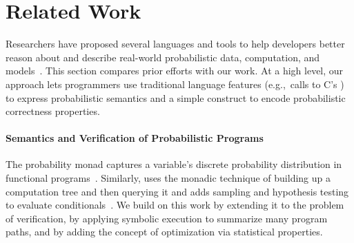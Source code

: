 

\section{Related Work}

Researchers have proposed several languages and tools to
help developers better reason about and describe real-world
probabilistic data, computation, and models~\cite{BBGR13,
  wingate-lightweight, church, chaganty, pfeffersample, pmonad,
  infernet, probdsl,uncertaint}.
This section compares prior efforts with our work.
At a high level, our approach lets programmers use traditional language
features (e.g.,~calls
to C's ) to express probabilistic semantics and a simple
construct to encode probabilistic correctness properties.

\paragraph{Semantics and Verification of Probabilistic Programs}
The probability monad captures a variable's discrete probability
distribution in functional programs~\cite{pmonad}.
Similarly,  uses the monadic technique of
building up a computation tree and then querying it and adds sampling and
hypothesis testing to evaluate conditionals~\cite{uncertaint}.
We build on this work by extending it to the problem of
verification, by applying symbolic execution to summarize many
program paths, and by adding the concept of optimization via
statistical properties.

